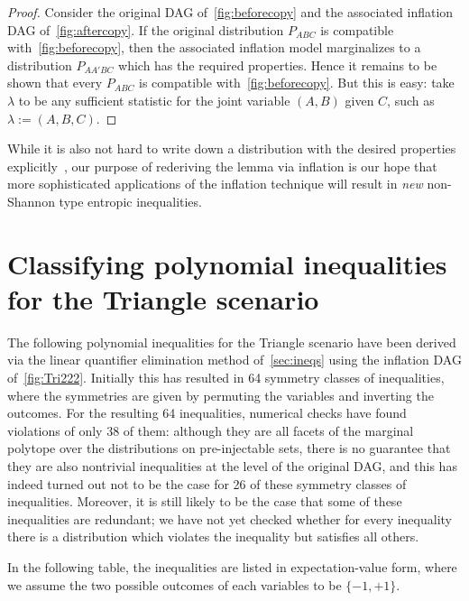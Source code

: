 \begin{proof}
	Consider the original DAG of~\cref{fig:beforecopy} and the associated inflation DAG of~\cref{fig:aftercopy}. If the original distribution $P_{ABC}$ is compatible with~\cref{fig:beforecopy}, then the associated inflation model marginalizes to a distribution $P_{AA'BC}$ which has the required properties. Hence it remains to be shown that every $P_{ABC}$ is compatible with~\cref{fig:beforecopy}. But this is easy: take $\lambda$ to be any sufficient statistic for the joint variable $(A,B)$ given $C$, such as $\lambda := (A,B,C)$.
\end{proof}

While it is also not hard to write down a distribution with the desired properties explicitly~\cite[Lemma~15.8]{yeung_network_2008}, our purpose of rederiving the lemma via inflation is our hope that more sophisticated applications of the inflation technique will result in \emph{new} non-Shannon type entropic inequalities.


\section{Classifying polynomial inequalities for the Triangle scenario}
\label{sec:38ineqs}

The following polynomial inequalities for the Triangle scenario have been derived via the linear quantifier elimination method of~\cref{sec:ineqs} using the inflation DAG of~\cref{fig:Tri222}. Initially this has resulted in 64 symmetry classes of inequalities, where the symmetries are given by permuting the variables and inverting the outcomes. For the resulting 64 inequalities, numerical checks have found violations of only 38 of them: although they are all facets of the marginal polytope over the distributions on pre-injectable sets, there is no guarantee that they are also nontrivial inequalities at the level of the original DAG, and this has indeed turned out not to be the case for 26 of these symmetry classes of inequalities. Moreover, it is still likely to be the case that some of these inequalities are redundant; we have not yet checked whether for every inequality there is a distribution which violates the inequality but satisfies all others.

In the following table, the inequalities are listed in expectation-value form, where we assume the two possible outcomes of each variables to be $\{-1,+1\}$.


